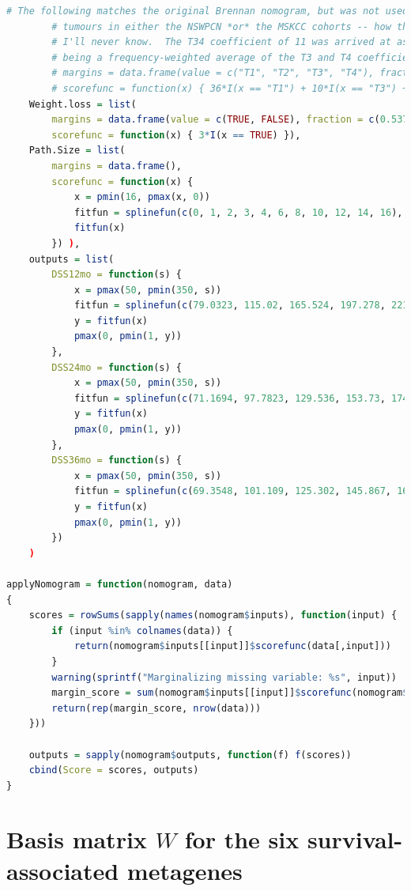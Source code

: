 \begin{lstlisting}[language=R]
		# The following matches the original Brennan nomogram, but was not used as there are too few T4
		# tumours in either the NSWPCN *or* the MSKCC cohorts -- how the T4 coefficient was ever estimated,
		# I'll never know.  The T34 coefficient of 11 was arrived at as (0.828*10+(1-0.037-0.119-0.828)*63)/(1-0.037-0.119),
		# being a frequency-weighted average of the T3 and T4 coefficients.
		# margins = data.frame(value = c("T1", "T2", "T3", "T4"), fraction = c(0.037, 0.119, 0.828, 1-0.037-0.119-0.828)),
		# scorefunc = function(x) { 36*I(x == "T1") + 10*I(x == "T3") + 63*I(x == "T4") }),
	Weight.loss = list(
		margins = data.frame(value = c(TRUE, FALSE), fraction = c(0.537, 1-0.537)),
		scorefunc = function(x) { 3*I(x == TRUE) }),
	Path.Size = list(
		margins = data.frame(),
		scorefunc = function(x) {
			x = pmin(16, pmax(x, 0))
			fitfun = splinefun(c(0, 1, 2, 3, 4, 6, 8, 10, 12, 14, 16), c(0, 29.74, 59.48, 86.70, 100, 97.29, 90.03, 82.77, 75.51, 68.25, 61.10), method = "natural")
			fitfun(x)
		}) ),
	outputs = list(
		DSS12mo = function(s) {
			x = pmax(50, pmin(350, s))
			fitfun = splinefun(c(79.0323, 115.02, 165.524, 197.278, 221.774, 242.339, 261.089, 279.839, 299.194, 323.992, 337.298), c(0.94, 0.9, 0.8, 0.7, 0.6, 0.5, 0.4, 0.3, 0.2, 0.1, 0.06))
			y = fitfun(x)
			pmax(0, pmin(1, y))
		},
		DSS24mo = function(s) {
			x = pmax(50, pmin(350, s))
			fitfun = splinefun(c(71.1694, 97.7823, 129.536, 153.73, 174.294, 193.347, 211.794, 231.452, 255.645, 303.125), c(0.86, 0.8, 0.7, 0.6, 0.5, 0.4, 0.3, 0.2, 0.1, 0.01))
			y = fitfun(x)
			pmax(0, pmin(1, y))
		},
		DSS36mo = function(s) {
			x = pmax(50, pmin(350, s))
			fitfun = splinefun(c(69.3548, 101.109, 125.302, 145.867, 164.919, 183.367, 202.722, 226.915, 274.093), c(0.8, 0.7, 0.6, 0.5, 0.4, 0.3, 0.2, 0.1, 0.01))
			y = fitfun(x)
			pmax(0, pmin(1, y))
		}) 
	)

applyNomogram = function(nomogram, data)
{
	scores = rowSums(sapply(names(nomogram$inputs), function(input) {
		if (input %in% colnames(data)) {
			return(nomogram$inputs[[input]]$scorefunc(data[,input]))
		}
		warning(sprintf("Marginalizing missing variable: %s", input))
		margin_score = sum(nomogram$inputs[[input]]$scorefunc(nomogram$inputs[[input]]$margins$value) * nomogram$inputs[[input]]$margins$fraction)
		return(rep(margin_score, nrow(data)))
	}))

	outputs = sapply(nomogram$outputs, function(f) f(scores))
	cbind(Score = scores, outputs)
}
\end{lstlisting}

\chapter{Basis matrix $W$ for the six survival-associated metagenes}
\label{app:sigs-w-matrix}


